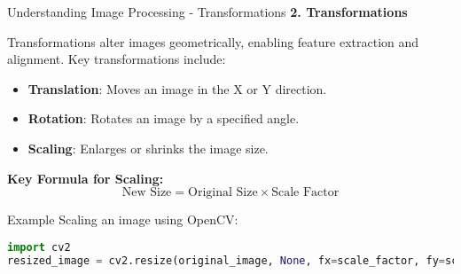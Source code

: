 \documentclass[aspectratio=169]{beamer}
\begin{document}
\begin{frame}[fragile]{Understanding Image Processing - Transformations}
    \textbf{2. Transformations}
    
    Transformations alter images geometrically, enabling feature extraction and alignment. Key transformations include:
    
    \begin{itemize}
        \item \textbf{Translation}: Moves an image in the X or Y direction.
        \item \textbf{Rotation}: Rotates an image by a specified angle.
        \item \textbf{Scaling}: Enlarges or shrinks the image size.
    \end{itemize}
    
    \textbf{Key Formula for Scaling:}
    \begin{equation}
        \text{New Size} = \text{Original Size} \times \text{Scale Factor}
    \end{equation}

    \begin{block}{Example}
        Scaling an image using OpenCV:
        \begin{lstlisting}[language=Python]
import cv2
resized_image = cv2.resize(original_image, None, fx=scale_factor, fy=scale_factor)
        \end{lstlisting}
    \end{block}
\end{frame}
\end{document}
